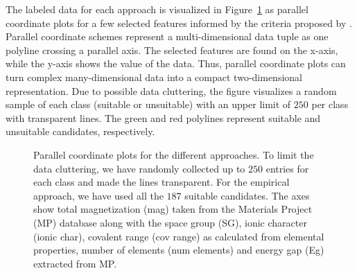 \documentclass[superscriptaddress,unsortedaddress,
 amsmath,amssymb,
 aps,
]{revtex4-2}
\begin{document}
The labeled data for each approach is visualized in Figure~\ref{fig:parallel-coordinates-approaches} as parallel coordinate plots for a few selected features informed by the criteria proposed by \citeauthor{Weber2010} \cite{Weber2010}. Parallel coordinate schemes  \cite{Inselberga1990, Inselberg1985} represent a multi-dimensional data tuple as one polyline crossing a parallel axis. The selected features are found on the x-axis, while the y-axis shows the value of the data. Thus, parallel coordinate plots can turn complex many-dimensional data into a compact  two-dimensional representation. Due to possible data cluttering, the figure visualizes a random sample of each class (suitable or unsuitable) with an upper limit of $250$ per class with transparent lines. The green and red polylines represent suitable and unsuitable candidates, respectively. 

\begin{figure}[t] %
    \centering
    \begin{subfigure}{1\textwidth}
        \centering
        \scalebox{0.85}{}
    \end{subfigure}
    \begin{subfigure}{1\textwidth}
        \centering
          \scalebox{0.85}{}
    \end{subfigure}
    \begin{subfigure}{1\textwidth}
        \centering
          \scalebox{0.85}{}
    \end{subfigure}
    \caption{Parallel coordinate plots for the different approaches. To limit the data cluttering, we have randomly collected up to $250$ entries for each class and made the lines transparent. For the empirical approach, we have used all the $187$ suitable candidates. The axes show total magnetization (mag) taken from the Materials Project (MP) database along with the space group (SG), ionic character (ionic char), covalent range (cov range) as calculated from elemental properties, number of elements (num elements) and energy gap (Eg) extracted from MP.} 
    \label{fig:parallel-coordinates-approaches}
\end{figure}
\end{document}

